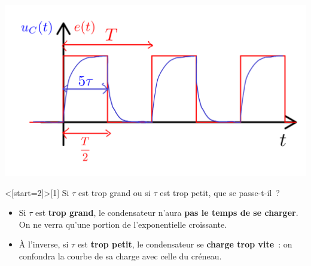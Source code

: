 \documentclass[../main/main.tex]{subfiles}
\begin{document}
{\begin{minipage}[t]{.35\linewidth}
\begin{center}
        \includegraphics[width=\linewidth]{creneau_taugood}
      \end{center}
    \end{minipage}
	}

\QR<[start=2]>[1]{%
	Si $\tau$ est trop grand ou si $\tau$ est trop petit, que se
	passe-t-il~?
}{%
	\begin{itemize}
		\item Si $\tau$ est \textbf{trop grand}, le condensateur n'aura \textbf{pas
            le temps de se charger}. On ne verra qu'une portion de
            l'exponentielle croissante.
		\item À l'inverse, si $\tau$ est \textbf{trop petit}, le condensateur se
          \textbf{charge trop vite}~: on confondra la courbe de sa charge avec
          celle du créneau.
	\end{itemize}
}


\end{document}
